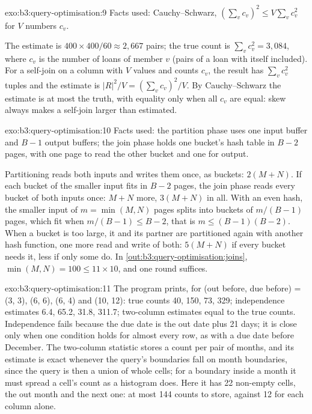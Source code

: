 \begin{solution}{exo:b3:query-optimisation:9}
Facts used: Cauchy--Schwarz, $(\sum_v c_v)^2 \le V \sum_v c_v^2$ for $V$ numbers $c_v$.

The estimate is $400 \times 400/60 \approx 2{,}667$ pairs; the true count is $\sum_v c_v^2 = 3{,}084$, where $c_v$ is the number of loans of member $v$ (pairs of a loan with itself included). For a self-join on a column with $V$ values and counts $c_v$, the result has $\sum_v c_v^2$ tuples and the estimate is $|R|^2/V = (\sum_v c_v)^2 / V$. By Cauchy--Schwarz the estimate is at most the truth, with equality only when all $c_v$ are equal: skew always makes a self-join larger than estimated.
\end{solution}

\begin{solution}{exo:b3:query-optimisation:10}
Facts used: the partition phase uses one input buffer and $B - 1$ output buffers; the join phase holds one bucket's hash table in $B - 2$ pages, with one page to read the other bucket and one for output.

Partitioning reads both inputs and writes them once, as buckets: $2(M + N)$. If each bucket of the smaller input fits in $B - 2$ pages, the join phase reads every bucket of both inputs once: $M + N$ more, $3(M + N)$ in all. With an even hash, the smaller input of $m = \min(M, N)$ pages splits into buckets of $m/(B-1)$ pages, which fit when $m/(B-1) \le B - 2$, that is $m \le (B-1)(B-2)$. When a bucket is too large, it and its partner are partitioned again with another hash function, one more read and write of both: $5(M + N)$ if every bucket needs it, less if only some do. In \cref{out:b3:query-optimisation:joins}, $\min(M, N) = 100 \le 11 \times 10$, and one round suffices.
\end{solution}

\begin{solution}{exo:b3:query-optimisation:11}
The program prints, for (out before, due before) = (3, 3), (6, 6), (6, 4) and (10, 12): true counts 40, 150, 73, 329; independence estimates 6.4, 65.2, 31.8, 311.7; two-column estimates equal to the true counts. Independence fails because the due date is the out date plus 21 days; it is close only when one condition holds for almost every row, as with a due date before December. The two-column statistic stores a count per pair of months, and its estimate is exact whenever the query's boundaries fall on month boundaries, since the query is then a union of whole cells; for a boundary inside a month it must spread a cell's count as a histogram does. Here it has 22 non-empty cells, the out month and the next one: at most 144 counts to store, against 12 for each column alone.
\end{solution}

